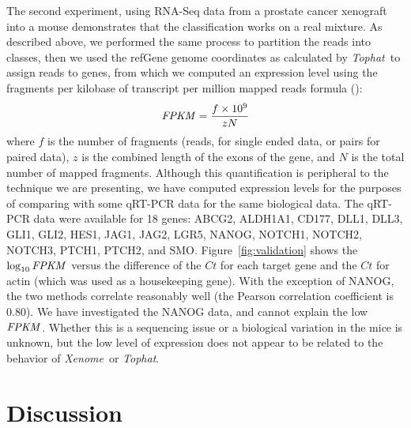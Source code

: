 \documentclass{bioinfo}
\newcommand{\Xenome}{\textit{Xenome}{}}
\newcommand{\Tophat}{\textit{Tophat}{}}
\newcommand{\fpkm}{\ensuremath{\hbox{\textit{FPKM}}}{}}
\begin{document}
The second experiment, using RNA-Seq data from a prostate cancer xenograft
into a mouse demonstrates that the classification works on a real mixture.
As described above, we performed the same process to partition the reads
into classes, then we used the refGene genome coordinates 
as calculated by \Tophat\  to assign
reads to genes, from which we computed an expression level using the
fragments per kilobase of transcript per million mapped reads formula
(\cite{trapnell2010}):
$$
    \fpkm = \frac{f \times 10^9}{zN}
$$
where $f$ is the number of fragments (reads, for single ended data, or
pairs for paired data), $z$ is the combined length of the exons of the
gene, and $N$ is the total number of mapped fragments.  Although this
quantification is peripheral to the technique we are presenting, we have
computed expression levels for the purposes of comparing with some qRT-PCR
data for the same biological data.  The qRT-PCR data were available for
18 genes: ABCG2, ALDH1A1, CD177, DLL1, DLL3, GLI1, GLI2, HES1, JAG1,
JAG2, LGR5, NANOG, NOTCH1, NOTCH2, NOTCH3, PTCH1, PTCH2, and SMO.
Figure~\ref{fig:validation} shows the $\log_{10} \fpkm$
versus the difference of the $Ct$ for each target gene and the $Ct$
for actin (which was used as a housekeeping gene).  With the exception of NANOG, the two methods correlate
reasonably well (the Pearson correlation coefficient is 0.80).  We have investigated the NANOG data, and cannot
explain the low \fpkm.
Whether this
is a sequencing issue or a biological variation in the mice is unknown, but
the low level of expression does not appear to be related to the behavior
of \Xenome\ or \Tophat.


\section{Discussion}
\label{sec:discussion}
\end{document}
